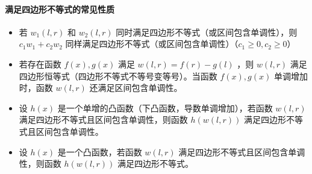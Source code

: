 \documentclass[a4paper,11pt]{article}
\begin{document}
\paragraph{满足四边形不等式的常见性质}
\begin{itemize}
\item
  若 \(w_1(l,r)\) 和 \(w_2(l,r)\) 同时满足四边形不等式（或区间包含单调性），则 \(c_1w_1+c_2w_2\) 同样满足四边形不等式（或区间包含单调性）（\(c_1\ge 0,c_2\ge 0\)）
\item
  若存在函数 \(f(x),g(x)\) 满足 \(w(l,r)=f(r)-g(l)\) ，则 \(w(l,r)\) 满足四边形恒等式（四边形不等式不等号变等号）。当函数 \(f(x),g(x)\) 单调增加时，函数 \(w(l,r)\) 还满足区间包含单调性。
\item
  设 \(h(x)\) 是一个单增的凸函数（下凸函数，导数单调增加），若函数 \(w(l,r)\) 满足四边形不等式且区间包含单调性，则函数 \(h(w(l,r))\) 满足四边形不等式且区间包含单调性。
\item
  设 \(h(x)\) 是一个凸函数，若函数 \(w(l,r)\) 满足四边形不等式且区间包含单调性，则函数 \(h(w(l,r))\) 满足四边形不等式。
\end{itemize}


\end{document}
